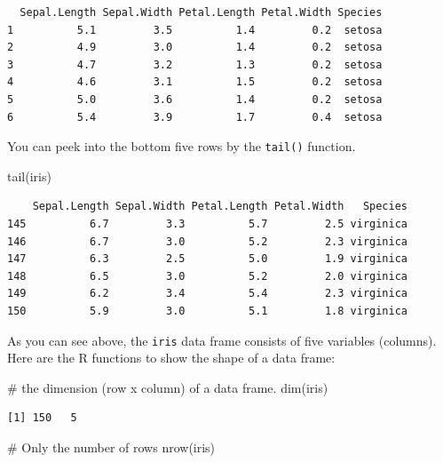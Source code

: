 \documentclass[
  letterpaper,
]{book}
\newenvironment{Shaded}{\begin{snugshade}}{\end{snugshade}}
\newcommand{\CommentTok}[1]{\textcolor[rgb]{0.37,0.37,0.37}{#1}}
\newcommand{\FunctionTok}[1]{\textcolor[rgb]{0.28,0.35,0.67}{#1}}
\newcommand{\NormalTok}[1]{\textcolor[rgb]{0.00,0.23,0.31}{#1}}
\begin{document}
\begin{verbatim}
  Sepal.Length Sepal.Width Petal.Length Petal.Width Species
1          5.1         3.5          1.4         0.2  setosa
2          4.9         3.0          1.4         0.2  setosa
3          4.7         3.2          1.3         0.2  setosa
4          4.6         3.1          1.5         0.2  setosa
5          5.0         3.6          1.4         0.2  setosa
6          5.4         3.9          1.7         0.4  setosa
\end{verbatim}

You can peek into the bottom five rows by the \texttt{tail()} function.

\begin{Shaded}
\begin{Highlighting}[]
\FunctionTok{tail}\NormalTok{(iris)}
\end{Highlighting}
\end{Shaded}

\begin{verbatim}
    Sepal.Length Sepal.Width Petal.Length Petal.Width   Species
145          6.7         3.3          5.7         2.5 virginica
146          6.7         3.0          5.2         2.3 virginica
147          6.3         2.5          5.0         1.9 virginica
148          6.5         3.0          5.2         2.0 virginica
149          6.2         3.4          5.4         2.3 virginica
150          5.9         3.0          5.1         1.8 virginica
\end{verbatim}

As you can see above, the \texttt{iris} data frame consists of five
variables (columns). Here are the R functions to show the shape of a
data frame:

\begin{Shaded}
\begin{Highlighting}[]
\CommentTok{\# the dimension (row x column) of a data frame.}
\FunctionTok{dim}\NormalTok{(iris)}
\end{Highlighting}
\end{Shaded}

\begin{verbatim}
[1] 150   5
\end{verbatim}

\begin{Shaded}
\begin{Highlighting}[]
\CommentTok{\# Only the number of rows}
\FunctionTok{nrow}\NormalTok{(iris)}
\end{Highlighting}
\end{Shaded}
\end{document}
